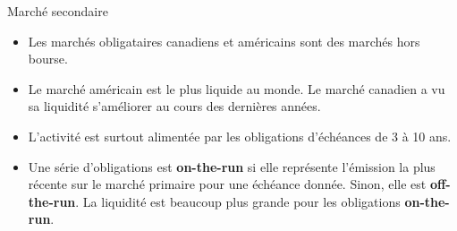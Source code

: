 \documentclass{beamer}
\begin{document}
\begin{frame}{Marché secondaire}
\begin{itemize}
\item Les marchés obligataires canadiens et américains sont des marchés hors bourse.  
\item Le marché américain est le plus liquide au monde.  Le marché canadien a vu sa liquidité s’améliorer au cours des dernières années.  
\item L’activité est surtout alimentée par les obligations d’échéances de 3 à 10 ans.  
\item Une série d’obligations est \textbf{on-the-run} si elle représente l’émission la plus récente sur le marché primaire pour une échéance donnée.  Sinon, elle est \textbf{off-the-run}.  La liquidité est beaucoup plus grande pour les obligations \textbf{on-the-run}.  
\end{itemize}
\end{frame}
\end{document}
